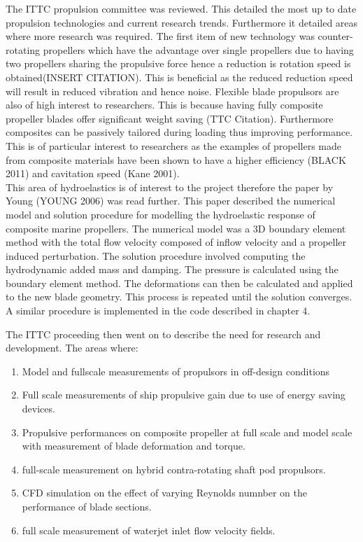 \documentclass[]{report}
\begin{document}
The ITTC propulsion committee was reviewed. This detailed the most up to date propulsion technologies and current research trends. Furthermore it detailed areas where more research was required. 
The first item of new technology was counter-rotating propellers which have the advantage over single propellers due to having two propellers sharing the propulsive force hence a reduction is rotation speed is obtained(INSERT CITATION). This is beneficial as the reduced reduction speed will result in reduced vibration and hence noise. 
Flexible blade propulsors are also of high interest to researchers. This is because having fully composite propeller blades offer significant weight saving (TTC Citation). Furthermore composites can be passively tailored during loading thus improving performance. This is of particular interest to researchers as the examples of propellers made from composite materials have been shown to have a higher efficiency (BLACK 2011) and cavitation speed (Kane 2001). 
\\
This area of hydroelastics is of interest to the project therefore the paper by Young (YOUNG 2006) was read further. This paper described the numerical model and solution procedure for modelling the hydroelastic response of composite marine propellers. The numerical model was a 3D boundary element method with the total flow velocity composed of inflow velocity and a propeller induced perturbation. The solution procedure involved computing the hydrodynamic added mass and damping. The pressure is calculated using the boundary element method. The deformations can then be calculated and applied to the new blade geometry. This process is repeated until the solution converges. A similar procedure is implemented in the code described in chapter 4. 

The ITTC proceeding then went on to describe the need for research and development. The areas where:
\begin{enumerate}
	\item Model and fullscale measurements of propulsors in off-design conditions
	\item Full scale measurements of ship propulsive gain due to use of energy saving devices.
	\item Propulsive performances on composite propeller at full scale and model scale with measurement of blade deformation and torque.
	\item full-scale measurement on hybrid contra-rotating shaft pod propulsors.
	\item CFD simulation on the effect of varying Reynolds numnber on the performance of blade sections.
	\item full scale measurement of waterjet inlet flow velocity fields.
\end{enumerate}
\end{document}
